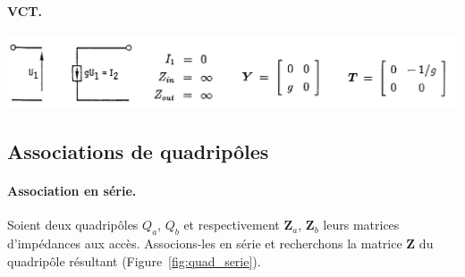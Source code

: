 \paragraph{VCT.}
\begin{center}
	\includegraphics[width=0.9\linewidth]{figs/QP/QP_VCT}
\end{center}



\subsection{Associations de quadripôles}

\paragraph{Association en série.}%
Soient deux quadripôles $Q_a$, $Q_b$ et respectivement $\mathbf{Z}_a$, $\mathbf{Z}_b$ leurs matrices d'impédances
aux accès. Associons-les en série et recherchons la matrice $\mathbf{Z}$ du quadripôle résultant (Figure~\ref{fig:quad_serie}).

